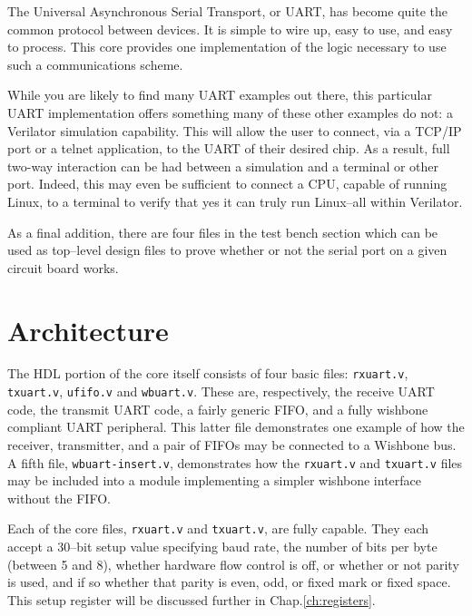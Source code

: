 \documentclass{gqtekspec}
\begin{document}
The Universal Asynchronous Serial Transport, or UART, has become quite the
common protocol between devices.  It is simple to wire up, easy to use, and
easy to process.  This core provides one implementation of the logic necessary
to use such a communications scheme.


While you are likely to find many UART examples out there, this particular
UART implementation offers something many of these other examples do not: a
Verilator simulation capability.  This will allow the user to connect, via
a TCP/IP port or a telnet application, to the UART of their desired chip.  As
a result, full two-way interaction can be had between a simulation and a
terminal or other port.  Indeed, this may even be sufficient to connect a
CPU, capable of running Linux, to a terminal to verify that yes it can truly
run Linux--all within Verilator.

As a final addition, there are four files in the test bench section which can
be used as top--level design files to prove whether or not the serial port on
a given circuit board works.

\chapter{Architecture}\label{ch:arch}

The HDL portion of the core itself consists of four basic files: {\tt rxuart.v},
{\tt txuart.v}, {\tt ufifo.v} and {\tt wbuart.v}.  These are, respectively, the
receive UART code, the transmit UART code, a fairly generic FIFO, and a fully
wishbone compliant UART peripheral.  This latter file demonstrates one example
of how the receiver, transmitter, and a pair of FIFOs may be connected to a
Wishbone bus.  A fifth file, {\tt wbuart-insert.v}, demonstrates how the
{\tt rxuart.v} and {\tt txuart.v} files may be included into a module
implementing a simpler wishbone interface without the FIFO.

Each of the core files, {\tt rxuart.v} and {\tt txuart.v}, are fully capable.
They each accept a 30--bit setup value specifying baud rate, the number of bits
per byte (between 5 and 8), whether hardware flow control is off, or whether or
not parity is used, and if so whether that parity is even, odd, or fixed mark
or fixed space.  This setup register will be discussed further in
Chap.\ref{ch:registers}.
\end{document}
